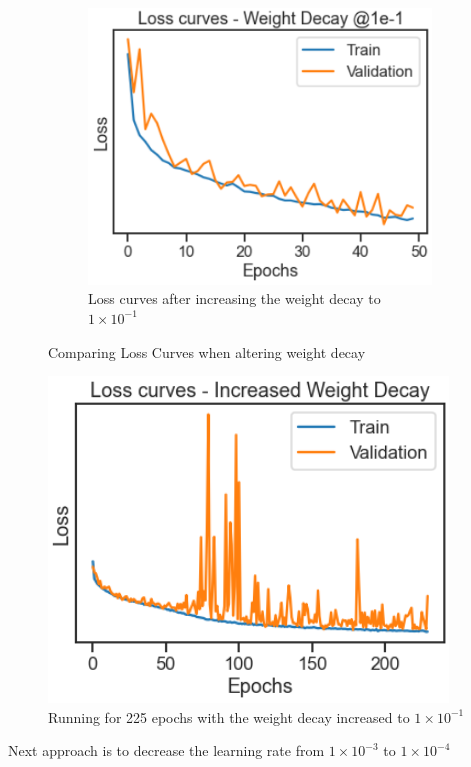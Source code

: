 \documentclass[a4paper, 12pt]{article}
\begin{document}
\begin{figure}[H]
\begin{subfigure}{.4\textwidth}
    \label{fig:wd1}
\end{subfigure} \hfill
\begin{subfigure}{.4\textwidth}
    \centering
    \includegraphics[width=1.1\textwidth, scale = 0.5]{Weightdecay2.PNG}
    \caption{Loss curves after increasing the weight decay to $1 \times 10^{-1}$}
    \label{fig:wd2}
\end{subfigure}%
\centering
\caption{Comparing Loss Curves when altering weight decay}

\end{figure}

\begin{figure}[H]
  \centering
  \includegraphics[scale = 0.8]{LossSpikes.PNG}
  \caption{Running for 225 epochs with the weight decay increased to $1 \times 10^{-1}$}
  \label{}
\end{figure}

Next approach is to decrease the learning rate from $1 \times 10^{-3}$ to $1 \times 10^{-4}$
\end{document}
